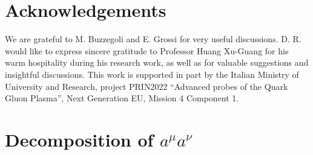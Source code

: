 \documentclass[prd,superscriptaddress,nofootinbib,notitlepage]{revtex4-1}
\begin{document}
\section*{Acknowledgements}
We are grateful to M. Buzzegoli and E. Grossi for very useful discussions. D. R. would like to express sincere 
gratitude to Professor Huang Xu-Guang for his warm hospitality during his research work, as well 
as for valuable suggestions and insightful discussions. This work is supported in part by the Italian 
Ministry of University and Research, project PRIN2022 “Advanced probes of the Quark Gluon Plasma”, Next 
Generation EU, Mission 4 Component 1.





\appendix


\section{Decomposition of $a^{\mu}a^{\nu}$}\label{SECTION: aa is not independent}
\end{document}
